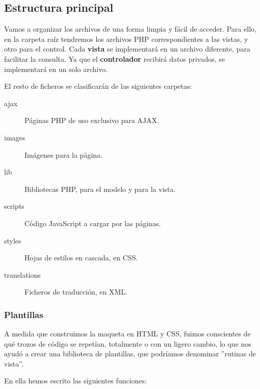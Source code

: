 \subsection{Estructura principal}

Vamos a organizar los archivos de una forma limpia y fácil de acceder. Para ello, en la carpeta raíz tendremos los archivos PHP correspondientes a las vistas, y otro para el control. Cada \textbf{vista} se implementará en un archivo diferente, para facilitar la consulta. Ya que el \textbf{controlador} recibirá datos privados, se implementará en un solo archivo.

El resto de ficheros se clasificarán de las siguientes carpetas:

\begin{description}
	\item[ajax] Páginas PHP de uso exclusivo para \acrshort{AJAX}.
	\item[images] Imágenes para la página.
	\item[lib] Bibliotecas PHP, para el modelo y para la vista.
	\item[scripts] Código JavaScript a cargar por las páginas.
	\item[styles] Hojas de estilos en cascada, en \acrshort{CSS}.
	\item[translations] Ficheros de traducción, en \acrshort{XML}.
\end{description}

\subsubsection{Plantillas}

A medida que construimos la maqueta en \acrshort{HTML} y \acrshort{CSS}, fuimos conscientes de qué trozos de código se repetían, totalmente o con un ligero cambio, lo que nos ayudó a crear una biblioteca de plantillas, que podríamos denominar ''rutinas de vista''.

En ella hemos escrito las siguientes funciones:

